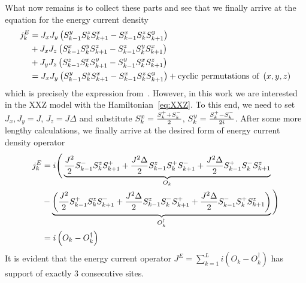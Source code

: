 What now remains is to collect these parts and see that we finally arrive at the equation for the energy current density
\begin{align}
    j_k^E &= J_x J_y \left(S^{y}_{k-1}S^{z}_k S^{x}_{k+1} - S^{x}_{k-1}S^{z}_{k}S^{y}_{k+1}\right) \nonumber \\
    &+ J_x J_z \left(S^{x}_{k-1}S^{y}_k S^{z}_{k+1} - S^{z}_{k-1}S^{y}_{k}S^{x}_{k+1}\right) \nonumber \\
    &+ J_y J_z \left(S^{z}_{k-1}S^{x}_k S^{y}_{k+1} - S^{y}_{k-1}S^{x}_{k}S^{z}_{k+1}\right) \nonumber \\
    &= J_x J_y \left(S^{y}_{k-1}S^{z}_k S^{x}_{k+1} - S^{x}_{k-1}S^{z}_{k}S^{y}_{k+1}\right) + \text{cyclic permutations of } \left(x,y,z\right)
    \label{eq:energy current density}
\end{align}
which is precisely the expression from~\textcite{Zotos1997}. 
However, in this work we are interested in the XXZ model with the Hamiltonian~\eqref{eq:XXZ}. To this end,
we need to set \(J_x, J_y = J\), \(J_z = J \Delta \) and substitute \(S^{x}_k = \frac{S^{+}_k + S^{-}_k}{2}\), \(S^{y}_k = \frac{S^{+}_k-S^{-}_k}{2i}\).
After some more lengthy calculations, we finally arrive at the desired form of energy current density operator
\begin{align}
    j_k^E &= i \Bigg( \underbrace{\frac{J^2}{2} S^{-}_{k-1}S^{z}_k S^{+}_{k+1} + \frac{J^2\Delta}{2} S^{z}_{k-1}S^{+}_k S^{-}_{k+1} + \frac{J^2\Delta}{2} S^{+}_{k-1}S^{-}_kS^{z}_{k+1}}_{O_k} \nonumber \\
    &- \underbrace{\left(\frac{J^2}{2} S^{+}_{k-1}S^{z}_k S^{-}_{k+1} + \frac{J^2\Delta}{2} S^{z}_{k-1}S^{-}_k S^{+}_{k+1} + \frac{J^2\Delta}{2} S^{-}_{k-1}S^{+}_{k} S^{z}_{k+1} \right)}_{O_k^{\dagger}}\Bigg) \nonumber \\
    &= i\left(O_k - O_k^{\dagger}\right)
    \label{eq:final energy current density}
\end{align}
It is evident that the energy current operator \(J^E = \sum_{k=1}^L i \left(O_k - O_k^{\dagger}\right) \) has support of exactly \(3\) consecutive sites.

